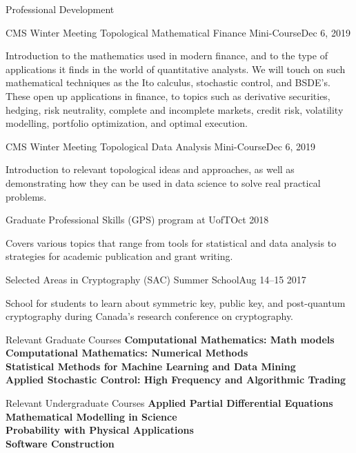 \documentclass{resume}
\begin{document}
\begin{rSection}{Professional Development}
\begin{rSubsection}{CMS Winter Meeting Topological Mathematical Finance Mini-Course}{Dec 6, 2019}{}{}
\item  Introduction to the mathematics used in modern finance, and to the type of applications it finds in the world of quantitative analysts. We will touch on such mathematical techniques as the Ito calculus, stochastic control, and BSDE’s. These open up applications in finance, to topics such as derivative securities, hedging, risk neutrality, complete and incomplete markets, credit risk, volatility modelling, portfolio optimization, and optimal execution.
\end{rSubsection}

\begin{rSubsection}{CMS Winter Meeting Topological Data Analysis Mini-Course}{Dec 6, 2019}{}{}
\item Introduction to relevant topological ideas and approaches, as well as demonstrating how they can be used in data science to solve real practical problems.
\end{rSubsection}

\begin{rSubsection}{Graduate Professional Skills (GPS) program at UofT}{Oct 2018}{}{}
\item Covers various topics that range from tools for statistical and data analysis to strategies for academic publication and grant writing.
\end{rSubsection}

\begin{rSubsection}{Selected Areas in Cryptography (SAC) Summer School}{Aug 14--15 2017}{}{}
\item School for students to learn about symmetric key, public key, and post-quantum cryptography during Canada's research conference on cryptography.
\end{rSubsection}

\end{rSection}

\begin{rSection}{Relevant Graduate Courses}
\textbf{Computational Mathematics: Math models}\\
\textbf{Computational Mathematics: Numerical Methods}\\
 \textbf{Statistical Methods for Machine Learning and Data Mining}\\
 \textbf{Applied Stochastic Control: High Frequency and Algorithmic Trading}
\end{rSection}

\begin{rSection}{Relevant Undergraduate Courses}
\textbf{Applied Partial Differential Equations}\\
\textbf{Mathematical Modelling in Science }\\
 \textbf{Probability with Physical Applications}\\
 \textbf{Software Construction}
\end{rSection}
\end{document}
